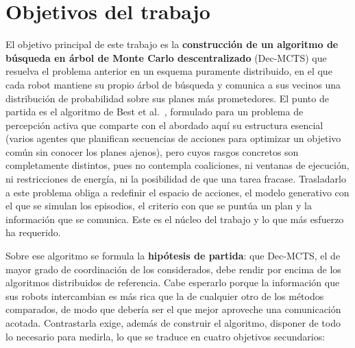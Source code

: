 \section{Objetivos del trabajo} \label{sec:intro-objetivos}

El objetivo principal de este trabajo es la \textbf{construcción de un algoritmo de búsqueda en árbol de Monte Carlo descentralizado} (Dec-MCTS) que resuelva el problema anterior en un esquema puramente distribuido, en el que cada robot mantiene su propio árbol de búsqueda y comunica a sus vecinos una distribución de probabilidad sobre sus planes más prometedores. El punto de partida es el algoritmo de Best et al.~\cite{best2019decmcts}, formulado para un problema de percepción activa que comparte con el abordado aquí su estructura esencial (varios agentes que planifican secuencias de acciones para optimizar un objetivo común sin conocer los planes ajenos), pero cuyos rasgos concretos son completamente distintos, pues no contempla coaliciones, ni ventanas de ejecución, ni restricciones de energía, ni la posibilidad de que una tarea fracase. Trasladarlo a este problema obliga a redefinir el espacio de acciones, el modelo generativo con el que se simulan los episodios, el criterio con que se puntúa un plan y la información que se comunica. Este es el núcleo del trabajo y lo que más esfuerzo ha requerido.

Sobre ese algoritmo se formula la \textbf{hipótesis de partida}: que Dec-MCTS, el de mayor grado de coordinación de los considerados, debe rendir por encima de los algoritmos distribuidos de referencia. Cabe esperarlo porque la información que sus robots intercambian es más rica que la de cualquier otro de los métodos comparados, de modo que debería ser el que mejor aproveche una comunicación acotada. Contrastarla exige, además de construir el algoritmo, disponer de todo lo necesario para medirla, lo que se traduce en cuatro objetivos secundarios:

